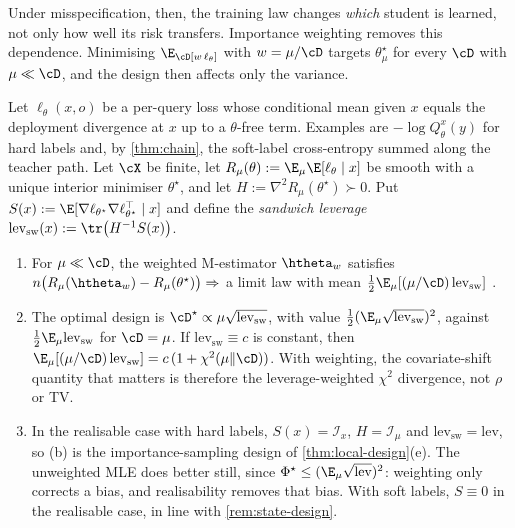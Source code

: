 \noindent
Under misspecification, then, the training law changes \emph{which} student is learned, not only how
well its risk transfers. Importance weighting removes this dependence. Minimising $\E_\cD[w\,\ell_\theta]$ with
$w=\mu/\cD$ targets $\theta^\star_\mu$ for every $\cD$ with $\mu\ll\cD$, and the design then affects only the variance.

\begin{proposition}\label{prop:iw-design}
Let $\ell_\theta(x,o)$ be a per-query loss whose conditional mean given $x$ equals the deployment
divergence at $x$ up to a $\theta$-free term. Examples are $-\log Q^x_\theta(y)$ for hard labels and, by
\cref{thm:chain}, the soft-label cross-entropy summed along the teacher path. Let $\cX$ be finite, let
$R_\mu(\theta):=\E_\mu\E[\ell_\theta\mid x]$ be smooth with a unique interior minimiser $\theta^\star$, and let
$H:=\nabla^2R_\mu(\theta^\star)\succ0$. Put $S(x):=\E[\nabla\ell_{\theta^\star}\nabla\ell_{\theta^\star}^\top\mid x]$ and define the
\emph{sandwich leverage} $\mathrm{lev}_{\mathrm{sw}}(x):=\tr\big(H^{-1}S(x)\big)$.
\begin{enumerate}[label=(\alph*),nosep]
\item \Kn\Ck For $\mu\ll\cD$, the weighted M-estimator $\htheta_w$ satisfies
$n\big(R_\mu(\htheta_w)-R_\mu(\theta^\star)\big)\Rightarrow$ a limit law with mean $\frac12\E_\mu[(\mu/\cD)\,\mathrm{lev}_{\mathrm{sw}}]$
\citep{shimodaira2000improving}.
\item \Pv\Ck The optimal design is $\cD^\star\propto\mu\sqrt{\mathrm{lev}_{\mathrm{sw}}}$, with value
$\frac12(\E_\mu\sqrt{\mathrm{lev}_{\mathrm{sw}}})^2$, against $\frac12\E_\mu\mathrm{lev}_{\mathrm{sw}}$ for $\cD=\mu$. If $\mathrm{lev}_{\mathrm{sw}}\equiv c$ is
constant, then $\E_\mu[(\mu/\cD)\,\mathrm{lev}_{\mathrm{sw}}]=c\,(1+\chi^2(\mu\|\cD))$. With weighting, the covariate-shift
quantity that matters is therefore the leverage-weighted $\chi^2$ divergence, not $\rho$ or TV.
\item \Pv In the realisable case with hard labels, $S(x)=\mathcal I_x$, $H=\mathcal I_\mu$ and $\mathrm{lev}_{\mathrm{sw}}=\mathrm{lev}$,
so (b) is the importance-sampling design of \cref{thm:local-design}(e). The unweighted MLE does better
still, since $\Phi^\star\le(\E_\mu\sqrt{\mathrm{lev}})^2$: weighting only corrects a bias, and realisability
removes that bias. With soft labels, $S\equiv0$ in the realisable case, in line with \cref{rem:state-design}.
\end{enumerate}
\end{proposition}
